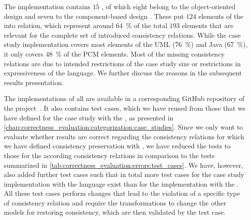 The implementation contains $15$ \commonalities, of which eight belong to the object-oriented design and seven to the component-based design \conceptmetamodel.
These \commonalities put $124$ elements of the \concretemetamodels into relation, which represent around \SI{64}{\percent} of the total $193$ elements that are relevant for the complete set of introduced consistency relations.
While the case study implementation covers most elements of the \gls{UML} (\SI{76}{\percent}) and Java (\SI{67}{\percent}), it only covers \SI{48}{\percent} of the \gls{PCM} elements.
Most of the missing consistency relations are due to intended restrictions of the case study size or restrictions in expressiveness of the \commonalities language.
We further discuss the reasons in the subsequent results presentation.

The implementations of all \commonalities are available in a corresponding GitHub repository of the \vitruv project~.
It also contains test cases, which we have reused from those that we have defined for the case study with the \reactionslanguage, as presented in \autoref{chap:correctness_evaluation:categorization:case_studies}.
Since we only want to evaluate whether results are correct regarding the consistency relations for which we have defined consistency preservation with \commonalities, we have reduced the tests to those for the according consistency relations in comparison to the tests summarized in \autoref{tab:correctness_evaluation:errors:test_cases}.
We have, however, also added further test cases such that in total more test cases for the case study implementation with the \commonalities language exist than for the implementation with the \reactionslanguage.
All these test cases perform changes that lead to the violation of a specific type of consistency relation and require the transformations to change the other models for restoring consistency, which are then validated by the test case.

